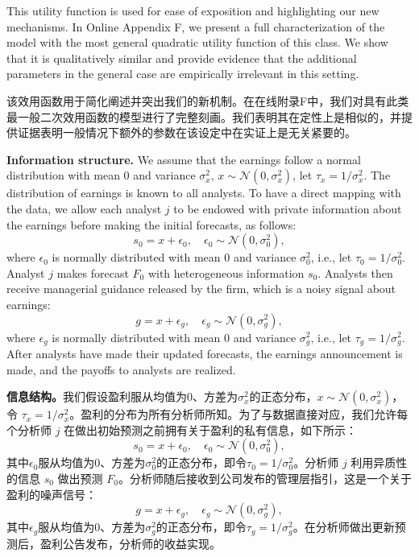 \documentclass[12pt,a4paper]{article}
\newenvironment{original}
  {\par\medskip\noindent\ignorespaces}
  {\par\medskip}
\newenvironment{translation}
  {\par\noindent{\color{transblue}\ignorespaces}}
  {\par\bigskip}
\begin{document}
\begin{original}
This utility function is used for ease of exposition and highlighting our new mechanisms. In Online Appendix F, we present a full characterization of the model with the most general quadratic utility function of this class. We show that it is qualitatively similar and provide evidence that the additional parameters in the general case are empirically irrelevant in this setting.
\end{original}
\begin{translation}
该效用函数用于简化阐述并突出我们的新机制。在在线附录F中，我们对具有此类最一般二次效用函数的模型进行了完整刻画。我们表明其在定性上是相似的，并提供证据表明一般情况下额外的参数在该设定中在实证上是无关紧要的。
\end{translation}

\begin{original}
\textbf{Information structure.} We assume that the earnings follow a normal distribution with mean 0 and variance $\sigma_x^2$, $x \sim \mathcal{N}(0,\sigma_x^2)$, let $\tau_x = 1/\sigma_x^2$. The distribution of earnings is known to all analysts. To have a direct mapping with the data, we allow each analyst $j$ to be endowed with private information about the earnings before making the initial forecasts, as follows:
\[
s_0 = x + \epsilon_0, \quad \epsilon_0 \sim \mathcal{N}(0,\sigma_0^2),
\]
where $\epsilon_0$ is normally distributed with mean 0 and variance $\sigma_0^2$, i.e., let $\tau_0 = 1/\sigma_0^2$. Analyst $j$ makes forecast $F_0$ with heterogeneous information $s_0$. Analysts then receive managerial guidance released by the firm, which is a noisy signal about earnings:
\[
g = x + \epsilon_g, \quad \epsilon_g \sim \mathcal{N}(0,\sigma_g^2),
\]
where $\epsilon_g$ is normally distributed with mean 0 and variance $\sigma_g^2$, i.e., let $\tau_g = 1/\sigma_g^2$. After analysts have made their updated forecasts, the earnings announcement is made, and the payoffs to analysts are realized.
\end{original}
\begin{translation}
\textbf{信息结构。}我们假设盈利服从均值为0、方差为$\sigma_x^2$的正态分布，$x \sim \mathcal{N}(0,\sigma_x^2)$，令 $\tau_x = 1/\sigma_x^2$。盈利的分布为所有分析师所知。为了与数据直接对应，我们允许每个分析师 $j$ 在做出初始预测之前拥有关于盈利的私有信息，如下所示：
\[
s_0 = x + \epsilon_0, \quad \epsilon_0 \sim \mathcal{N}(0,\sigma_0^2),
\]
其中$\epsilon_0$服从均值为0、方差为$\sigma_0^2$的正态分布，即令$\tau_0 = 1/\sigma_0^2$。分析师 $j$ 利用异质性的信息 $s_0$ 做出预测 $F_0$。分析师随后接收到公司发布的管理层指引，这是一个关于盈利的噪声信号：
\[
g = x + \epsilon_g, \quad \epsilon_g \sim \mathcal{N}(0,\sigma_g^2),
\]
其中$\epsilon_g$服从均值为0、方差为$\sigma_g^2$的正态分布，即令$\tau_g = 1/\sigma_g^2$。在分析师做出更新预测后，盈利公告发布，分析师的收益实现。
\end{translation}
\end{document}
